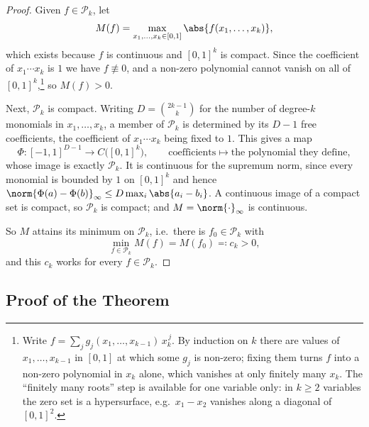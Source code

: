 \begin{proof}
    Given \(f \in \mathcal{P}_k\), let
    \[
        M(f) = \max_{x_1, \ldots, x_k \in [0,1]} \abs{f(x_1, \ldots, x_k)},
    \]
    which exists because \(f\) is continuous and \([0,1]^k\) is compact. Since the coefficient of \(x_1 \cdots x_k\) is \(1\) we have \(f \not\equiv 0\), and a non-zero polynomial cannot vanish on all of \([0,1]^k\),\footnote{Write \(f = \sum_j g_j(x_1, \ldots, x_{k-1}) \, x_k^{\,j}\). By induction on \(k\) there are values of \(x_1, \ldots, x_{k-1}\) in \([0,1]\) at which some \(g_j\) is non-zero; fixing them turns \(f\) into a non-zero polynomial in \(x_k\) alone, which vanishes at only finitely many \(x_k\). The ``finitely many roots'' step is available for one variable only: in \(k \ge 2\) variables the zero set is a hypersurface, e.g.\ \(x_1 - x_2\) vanishes along a diagonal of \([0,1]^2\).} so \(M(f) > 0\).

    Next, \(\mathcal{P}_k\) is compact. Writing \(D = \binom{2k-1}{k}\) for the number of degree-\(k\) monomials in \(x_1, \ldots, x_k\), a member of \(\mathcal{P}_k\) is determined by its \(D-1\) free coefficients, the coefficient of \(x_1 \cdots x_k\) being fixed to \(1\). This gives a map
    \[
        \Phi \colon [-1,1]^{D-1} \longrightarrow C\bigl( [0,1]^k \bigr), \qquad \text{coefficients} \longmapsto \text{the polynomial they define},
    \]
    whose image is exactly \(\mathcal{P}_k\). It is continuous for the supremum norm, since every monomial is bounded by \(1\) on \([0,1]^k\) and hence \(\norm{\Phi(a) - \Phi(b)}_\infty \le D \max_i \abs{a_i - b_i}\). A continuous image of a compact set is compact, so \(\mathcal{P}_k\) is compact; and \(M = \norm{\cdot}_\infty\) is continuous.

    So \(M\) attains its minimum on \(\mathcal{P}_k\), i.e.\ there is \(f_0 \in \mathcal{P}_k\) with
    \[
        \min_{f \in \mathcal{P}_k} M(f) = M(f_0) \eqqcolon c_k > 0,
    \]
    and this \(c_k\) works for every \(f \in \mathcal{P}_k\).
\end{proof}

\subsection{Proof of the Theorem}

